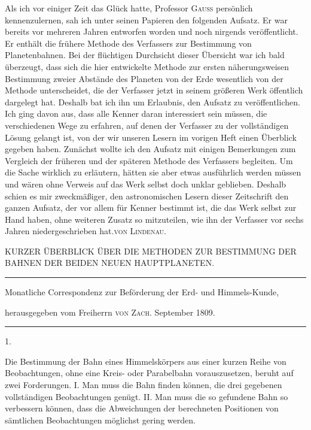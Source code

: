 \expandafter\def\csname HistoricalNoteText8\endcsname{Als ich vor einiger Zeit das Glück hatte, Professor \textsc{Gauss} persönlich kennenzulernen, sah ich unter seinen Papieren den folgenden Aufsatz. Er war bereits vor mehreren Jahren entworfen worden und noch nirgends veröffentlicht. Er enthält die frühere Methode des Verfassers zur Bestimmung von Planetenbahnen. Bei der flüchtigen Durchsicht dieser Übersicht war ich bald überzeugt, dass sich die hier entwickelte Methode zur ersten näherungsweisen Bestimmung zweier Abstände des Planeten von der Erde wesentlich von der Methode unterscheidet, die der Verfasser jetzt in seinem größeren Werk öffentlich dargelegt hat. Deshalb bat ich ihn um Erlaubnis, den Aufsatz zu veröffentlichen. Ich ging davon aus, dass alle Kenner daran interessiert sein müssen, die verschiedenen Wege zu erfahren, auf denen der Verfasser zu der vollständigen Lösung gelangt ist, von der wir unseren Lesern im vorigen Heft einen Überblick gegeben haben. Zunächst wollte ich den Aufsatz mit einigen Bemerkungen zum Vergleich der früheren und der späteren Methode des Verfassers begleiten. Um die Sache wirklich zu erläutern, hätten sie aber etwas ausführlich werden müssen und wären ohne Verweis auf das Werk selbst doch unklar geblieben. Deshalb schien es mir zweckmäßiger, den astronomischen Lesern dieser Zeitschrift den ganzen Aufsatz, der vor allem für Kenner bestimmt ist, die das Werk selbst zur Hand haben, ohne weiteren Zusatz so mitzuteilen, wie ihn der Verfasser vor sechs Jahren niedergeschrieben hat.\hfill\textsc{von Lindenau.}}
\clearpage{}%
\begin{center}
{\small KURZER ÜBERBLICK ÜBER DIE METHODEN ZUR BESTIMMUNG DER BAHNEN DER BEIDEN NEUEN HAUPTPLANETEN.\par}
\medskip\hrule\medskip
{\small Monatliche Correspondenz zur Beförderung der Erd- und Himmels-Kunde,\par
herausgegeben vom Freiherrn \textsc{von Zach}. September 1809.\par}
\medskip\hrule
\end{center}\medskip
\begin{center}1.\end{center}
Die Bestimmung der Bahn eines Himmelskörpers aus einer kurzen Reihe von Beobachtungen, ohne eine Kreis- oder Parabelbahn vorauszusetzen, beruht auf zwei Forderungen. I. Man muss die Bahn finden können, die drei gegebenen vollständigen Beobachtungen genügt. II. Man muss die so gefundene Bahn so verbessern können, dass die Abweichungen der berechneten Positionen von sämtlichen Beobachtungen möglichst gering werden.

